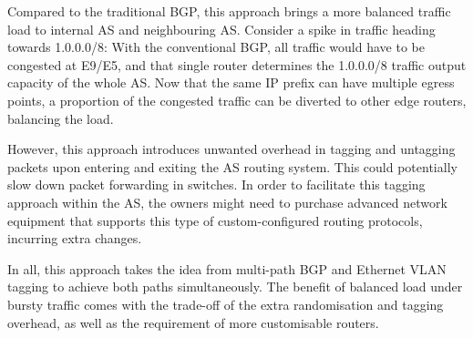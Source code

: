 \documentclass[12pt]{article}
\begin{document}
Compared to the traditional BGP, this approach brings a more balanced traffic load to internal AS and neighbouring AS. Consider a spike in traffic heading towards 1.0.0.0/8: With the conventional BGP, all traffic would have to be congested at E9/E5, and that single router determines the 1.0.0.0/8 traffic output capacity of the whole AS. Now that the same IP prefix can have multiple egress points, a proportion of the congested traffic can be diverted to other edge routers, balancing the load.

However, this approach introduces unwanted overhead in tagging and untagging packets upon entering and exiting the AS routing system. This could potentially slow down packet forwarding in switches. In order to facilitate this tagging approach within the AS, the owners might need to purchase advanced network equipment that supports this type of custom-configured routing protocols, incurring extra changes.

In all, this approach takes the idea from multi-path BGP and Ethernet VLAN tagging to achieve both paths simultaneously. The benefit of balanced load under bursty traffic comes with the trade-off of the extra randomisation and tagging overhead, as well as the requirement of more customisable routers.
\end{document}
